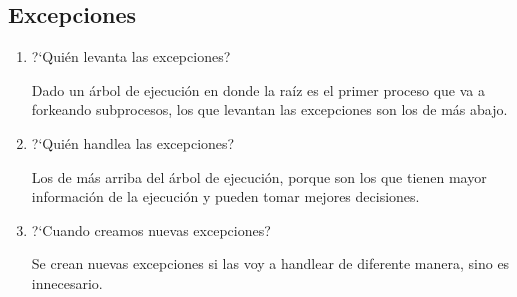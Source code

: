 \subsection{Excepciones}

\begin{enumerate}
 \item ?`Qui\'en levanta las excepciones?
 
  Dado un \'arbol de ejecuci\'on en donde la ra\'iz es el primer proceso que va a forkeando subprocesos, los que levantan las excepciones son los de m\'as abajo. 
  
 \item ?`Qui\'en handlea las excepciones?
 
  Los de m\'as arriba del \'arbol de ejecuci\'on, porque son los que tienen mayor informaci\'on de la ejecuci\'on y pueden tomar mejores decisiones. 
  
 \item ?`Cuando creamos nuevas excepciones?
 
  Se crean nuevas excepciones si las voy a handlear de diferente manera, sino es innecesario. 
  
\end{enumerate}
